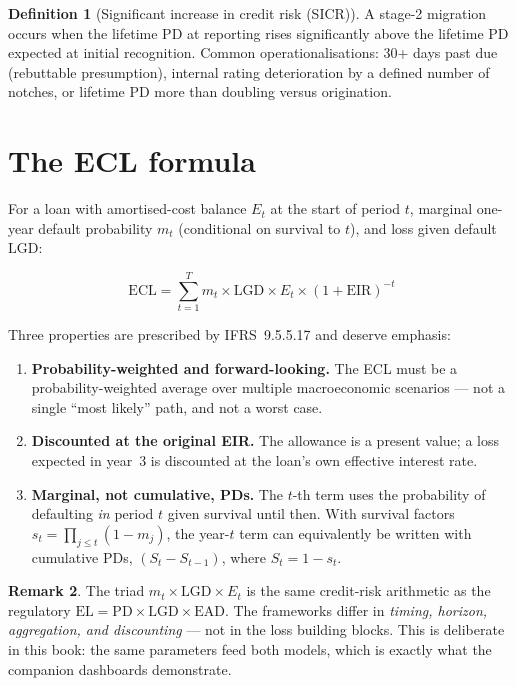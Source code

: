 \documentclass[11pt,a4paper]{report}
\theoremstyle{definition}
\newtheorem{definition}{Definition}[chapter]
\newtheorem{remark}[definition]{Remark}
\theoremstyle{plain}
\newcommand{\PD}{\mathrm{PD}}
\newcommand{\LGD}{\mathrm{LGD}}
\newcommand{\EAD}{\mathrm{EAD}}
\newcommand{\EL}{\mathrm{EL}}
\newcommand{\EIR}{\mathrm{EIR}}
\newcommand{\ECL}{\mathrm{ECL}}
\begin{document}
\begin{definition}[Significant increase in credit risk (SICR)]
A stage-2 migration occurs when the lifetime PD at reporting rises
significantly above the lifetime PD expected at initial recognition.
Common operationalisations: 30+ days past due (rebuttable
presumption), internal rating deterioration by a defined number of
notches, or lifetime PD more than doubling versus origination.
\end{definition}

\section{The ECL formula}

For a loan with amortised-cost balance $E_t$ at the start of period $t$,
marginal one-year default probability $m_t$ (conditional on survival to
$t$), and loss given default $\LGD$:

\begin{equation}
  \boxed{\;
  \ECL=\sum_{t=1}^{T} m_t\times\LGD\times E_t\times(1+\EIR)^{-t}}
  \label{eq:ecl}
\end{equation}

Three properties are prescribed by IFRS~9.5.5.17 and deserve emphasis:

\begin{enumerate}
\item \textbf{Probability-weighted and forward-looking.} The ECL must
      be a probability-weighted average over multiple macroeconomic
      scenarios --- not a single ``most likely'' path, and not a worst
      case.
\item \textbf{Discounted at the original EIR.} The allowance is a
      present value; a loss expected in year~3 is discounted at the
      loan's own effective interest rate.
\item \textbf{Marginal, not cumulative, PDs.} The $t$-th term uses the
      probability of defaulting \emph{in} period $t$ given survival
      until then. With survival factors
      $s_t=\prod_{j\le t}(1-m_j)$, the year-$t$ term can equivalently
      be written with cumulative PDs, $(S_t-S_{t-1})$, where
      $S_t=1-s_t$.
\end{enumerate}

\begin{remark}
The triad $m_t\times\LGD\times E_t$ is the same credit-risk arithmetic
as the regulatory $\EL=\PD\times\LGD\times\EAD$. The frameworks differ
in \emph{timing, horizon, aggregation, and discounting} --- not in the
loss building blocks. This is deliberate in this book: the same
parameters feed both models, which is exactly what the companion
dashboards demonstrate.
\end{remark}
\end{document}
